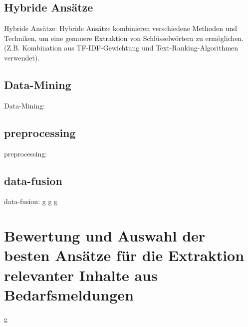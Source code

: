 \subsection{Hybride Ansätze}
Hybride Ansätze: Hybride Ansätze kombinieren verschiedene Methoden und Techniken, um eine genauere Extraktion von Schlüsselwörtern zu ermöglichen. (Z.B. Kombination aus TF-IDF-Gewichtung und Text-Ranking-Algorithmen verwendet).\cite{darmawan2015hybrid} \\

\subsection{Data-Mining}
Data-Mining: \cite{jun2001review}\cite{jain2013data}

\subsection{preprocessing}
preprocessing: \cite{garcia2016big}

\subsection{data-fusion}
data-fusion: \cite{famili1997data} \cite{frank2005comparing} \cite{bohne2013data}
\newpage
g
\newpage
g
\newpage
g
\newpage

\section{Bewertung und Auswahl der besten Ansätze für die Extraktion relevanter Inhalte aus Bedarfsmeldungen}

\newpage
g
\newpage